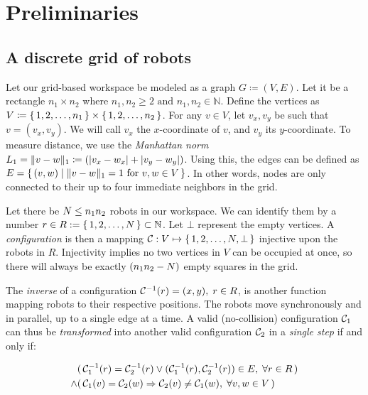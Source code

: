 \section{Preliminaries}

\subsection{A discrete grid of robots}

Let our grid-based workspace be modeled as a graph \( G \coloneqq (V, E)\). 
Let it be a rectangle \(n_1 \times n_2\) where \(n_1, n_2 \geq 2 \text{ and } n_1, n_2 \in \mathbb{N}\). 
Define the vertices as \(V \coloneqq \set{1, 2, \dots , n_1} \times \set{1, 2, \dots , n_2}\).
For any \(v \in V\), let \(v_x, v_y\) be such that \(v = (v_x, v_y)\). 
We will call \(v_x\) the \(x\)-coordinate of \(v\), and \(v_y\) its \(y\)-coordinate.
To measure distance, we use the \emph{Manhattan norm} \(L_1 = \lVert v - w\rVert_1 \coloneqq (\lvert v_x - w_x\rvert + \lvert v_y - w_y\rvert)\). Using this, the edges can be defined as \(E = \set{(v, w) \mid \lVert v - w\rVert_1 = 1 \text{ for } v, w \in V}\). In other words, nodes are only connected to their up to four immediate neighbors in the grid.

Let there be \(N \leq { \ensuremath{n_{1}n_{2}} }\)  robots in our workspace. 
We can identify them by a number \(r \in R := \set{1, 2, \dots , N} \subset \mathbb{N}\). 
Let \(\bot\) represent the empty vertices.
A \emph{configuration} is then a mapping \(\mathcal{C}_{} : V \mapsto \set{1, 2, \dots, N, \bot}\) injective upon the robots in \(R\). 
Injectivity implies no two vertices in \(V\) can be occupied at once, so there will always be exactly \(({ n_{1}n_{2} } - N)\) empty squares in the grid.

The \emph{inverse} of a configuration \(\mathcal{C}_{}^{-1}(r) = (x, y), \; r \in R\), is another function mapping robots to their respective positions.
The robots move synchronously and in parallel, up to a single edge at a time. 
A valid (no-collision) configuration \(\mathcal{C}_{1}\) can thus be \emph{transformed} into another valid configuration \(\mathcal{C}_{2}\) in a \emph{single step} if and only if:

\begin{align}
	& (\, \mathcal{C}_{1}^{-1}(r) = \mathcal{C}_{2}^{-1}(r) \lor (\mathcal{C}_{1}^{-1}(r), \mathcal{C}_{2}^{-1}(r)) \in E, \; \forall r \in R \,)\label{req:limited_movement}\\
	\land & (\, \mathcal{C}_{1}(v) = \mathcal{C}_{2}(w) \Rightarrow \mathcal{C}_{2}(v) \neq \mathcal{C}_{1}(w), \; \forall v, w \in V \,)\label{req:no_swaps}
\end{align}

